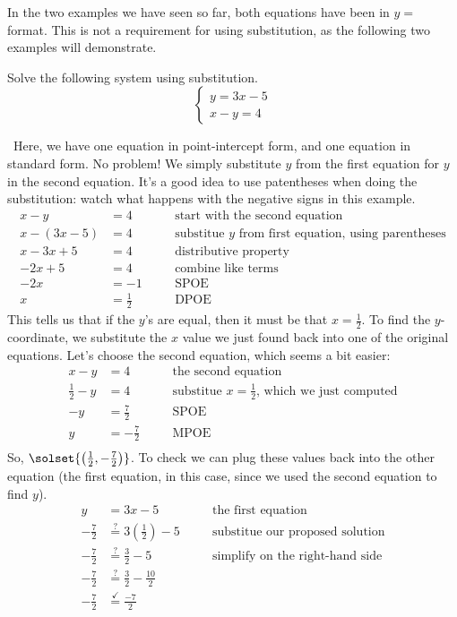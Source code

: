 In the two examples we have seen so far, both equations have been in $y=$ format. This is not a requirement for using substitution, as the following two examples will demonstrate.

\begin{boxedex}
Solve the following system using substitution.
\[
\left\{%
\begin{array}{l}
y=3x-5\\
x-y=4
\end{array}
\right.
\] 

\exsoln\ Here, we have one equation in point-intercept form, and one equation in standard form. No problem! We simply substitute $y$ from the first equation for $y$ in the second equation. It's a good idea to use patentheses when doing the substitution: watch what happens with the negative signs in this example.
\[\begin{aligned}
x-y &= 4
&& \quad\text{start with the second equation}\\
x-(3x-5) &= 4
&& \quad\text{substitue $y$ from first equation, using parentheses}\\
x - 3x + 5 &= 4
&& \quad\text{distributive property}\\
-2x + 5 &= 4
&& \quad\text{combine like terms}\\
-2x &= -1
&& \quad\text{SPOE}\\[1ex]
x &= \frac{1}{2}
&& \quad\text{DPOE}
\end{aligned}\]
This tells us that if the $y$'s are equal, then it must be that $x=\frac{1}{2}$. To find the $y$-coordinate, we substitute the $x$ value we just found back into one of the original equations. Let's choose the second equation, which seems a bit easier:
\[\begin{aligned}
x-y &= 4
&& \quad\text{the second equation}\\[1ex]
\frac{1}{2}-y &= 4
&& \quad\text{substitue $x = \tfrac{1}{2}$, which we just computed}\\[1ex]
-y &= \frac{7}{2}
&& \quad\text{SPOE}\\
y &= -\frac{7}{2}
&& \quad\text{MPOE}\\
\end{aligned}\]
So, $\solset{\left(\frac{1}{2}, -\frac{7}{2}\right)}$. To check we can plug these values back into the other equation (the first equation, in this case, since we used the second equation to find $y$).
\[\begin{aligned}
y &= 3x-5
&& \quad\text{the first equation}\\[1ex]
-\frac{7}{2} &\overset{?}{=} 3\left(\frac{1}{2}\right)-5
&& \quad\text{substitue our proposed solution}\\[1ex]
-\frac{7}{2} &\overset{?}{=} \frac{3}{2}-5
&& \quad\text{simplify on the right-hand side}\\[1ex]
-\frac{7}{2} &\overset{?}{=} \frac{3}{2}-\frac{10}{2}
&& \quad\text{}\\[1ex]
-\frac{7}{2} &\overset{\checkmark}{=} \frac{-7}{2}
&& \quad\text{}
\end{aligned}\]
\end{boxedex}

